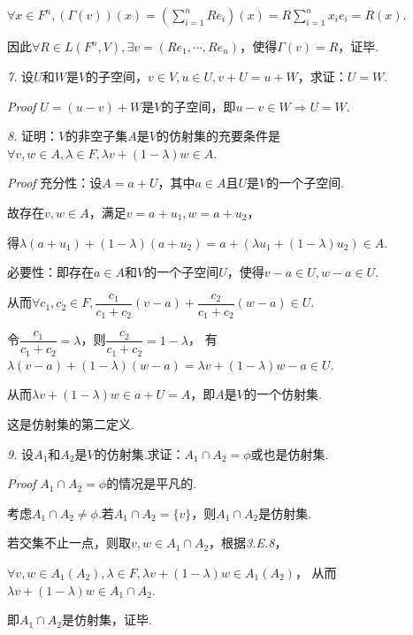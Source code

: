 \(\forall x \in F^n,(\Gamma(v))(x)=(\sum_{i=1}^n Re_i)(x)=R\sum_{i=1}^n x_ie_i=R(x)\).

因此\(\forall R \in L(F^n,V),\exists v=(Re_1,\cdots,Re_n)\)，使得\(\Gamma(v)=R\)，证毕.

\hspace*{\fill}

\textit{7.}
设\(U\)和\(W\)是\(V\)的子空间，\(v \in V,u \in U,v+U=u+W\)，求证：\(U=W\).

\textit{Proof}
\(U=(u-v)+W\)是\(V\)的子空间，即\(u-v \in W \Rightarrow U=W\).

\hspace*{\fill}

\textit{8.}
证明：\(V\)的非空子集\(A\)是\(V\)的仿射集的充要条件是\(\forall v,w \in A,\lambda \in F,\lambda v+(1- \lambda)w \in A\).

\textit{Proof}
充分性：设\(A=a+U\)，其中\(a\in A\)且\(U\)是\(V\)的一个子空间.

故存在\(v,w \in A\)，满足\(v=a+u_1,w=a+u_2\)，

得\(\lambda(a+u_1)+(1-\lambda)(a+u_2)=a+(\lambda u_1+(1-\lambda)u_2) \in A\).

必要性：即存在\(a \in A\)和\(V\)的一个子空间\(U\)，使得\(v-a \in U,w-a \in U\).

从而\(\forall c_1,c_2 \in F,\dfrac{c_1}{c_1+c_2}(v-a)+\dfrac{c_2}{c_1+c_2}(w-a) \in U\).

令\(\dfrac{c_1}{c_1+c_2}=\lambda\)，则\(\dfrac{c_2}{c_1+c_2}=1-\lambda\)，
有\(\lambda (v-a)+(1- \lambda)(w-a)=\lambda v+(1- \lambda)w-a \in U\).

从而\(\lambda v+(1- \lambda)w \in a+U=A\)，即\(A\)是\(V\)的一个仿射集.

这是仿射集的第二定义.

\newpage

\textit{9.}
设\(A_1\)和\(A_2\)是\(V\)的仿射集.求证：\(A_1 \cap A_2=\phi\)或也是仿射集.

\textit{Proof}
\(A_1 \cap A_2=\phi\)的情况是平凡的.

考虑\(A_1 \cap A_2 \ne \phi\).若\(A_1 \cap A_2=\{v\}\)，则\(A_1 \cap A_2\)是仿射集.

若交集不止一点，则取\(v,w \in A_1 \cap A_2\)，根据\textit{3.E.8}，

\(\forall v,w \in A_1(A_2),\lambda \in F,\lambda v+(1- \lambda)w \in A_1(A_2)\)，
从而\(\lambda v+(1- \lambda)w \in A_1 \cap A_2\).

即\(A_1 \cap A_2\)是仿射集，证毕.

\hspace*{\fill}

